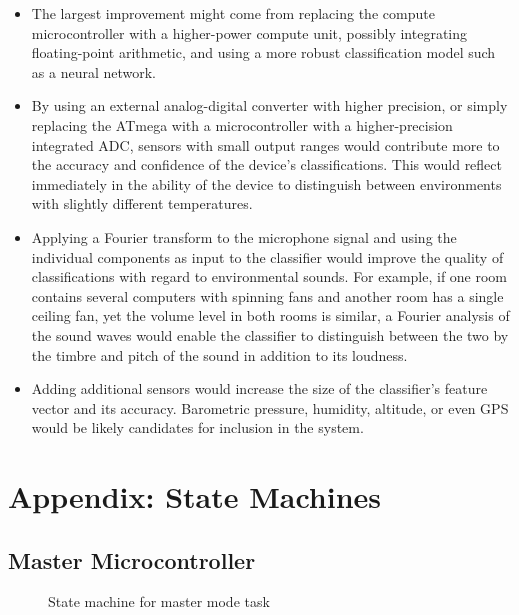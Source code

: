 \documentclass{article}
\begin{document}
\begin{itemize}

  \item The largest improvement might come from replacing the compute
    microcontroller with a higher-power compute unit, possibly
    integrating floating-point arithmetic, and using a more robust
    classification model such as a neural network.

  \item By using an external analog-digital converter with higher
    precision, or simply replacing the ATmega with a microcontroller
    with a higher-precision integrated ADC, sensors with small output
    ranges would contribute more to the accuracy and confidence of the
    device's classifications.  This would reflect immediately in the
    ability of the device to distinguish between environments with
    slightly different temperatures.

  \item Applying a Fourier transform to the microphone signal and using
    the individual components as input to the classifier would improve
    the quality of classifications with regard to environmental sounds.
    For example, if one room contains several computers with spinning
    fans and another room has a single ceiling fan, yet the volume level
    in both rooms is similar, a Fourier analysis of the sound waves
    would enable the classifier to distinguish between the two by the
    timbre and pitch of the sound in addition to its loudness.

  \item Adding additional sensors would increase the size of the
    classifier's feature vector and its accuracy.  Barometric pressure,
    humidity, altitude, or even GPS would be likely candidates for
    inclusion in the system.

\end{itemize}

\appendix

\section{Appendix: State Machines}
\label{app.sm}

\subsection{Master Microcontroller}
\label{app.sm.master}

\begin{figure}[H]
  \centering
  \caption{State machine for master mode task}
  
  \label{sm:1}
\end{figure}
\end{document}
